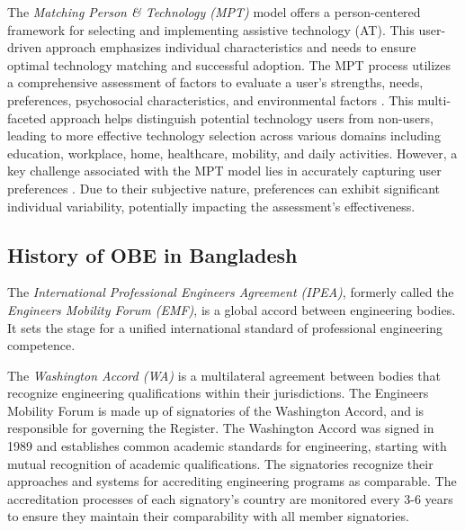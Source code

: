 \documentclass[journal,onecolumn]{IEEEtran}
\begin{document}
\vspace{12pt}


The \textit{Matching Person \& Technology (MPT)} model offers a person-centered framework for selecting and implementing assistive technology (AT). This user-driven approach emphasizes individual characteristics and needs to ensure optimal technology matching and successful adoption. The MPT process utilizes a comprehensive assessment of factors to evaluate a user's strengths, needs, preferences, psychosocial characteristics, and environmental factors \cite{scherer_matching_2017}. This multi-faceted approach helps distinguish potential technology users from non-users, leading to more effective technology selection across various domains including education, workplace, home, healthcare, mobility, and daily activities. However, a key challenge associated with the MPT model lies in accurately capturing user preferences \cite{scherer_matching_2002}. Due to their subjective nature, preferences can exhibit significant individual variability, potentially impacting the assessment's effectiveness.

\subsection{\textbf{History of OBE in Bangladesh}}
The \textit{International Professional Engineers Agreement (IPEA)}, formerly called the \textit{Engineers Mobility Forum (EMF)}, is a global accord between engineering bodies. It sets the stage for a unified international standard of professional engineering competence.

The \textit{Washington Accord (WA)} is a multilateral agreement between bodies that recognize engineering qualifications within their jurisdictions. The Engineers Mobility Forum is made up of signatories of the Washington Accord, and is responsible for governing the Register. The Washington Accord was signed in 1989 and establishes common academic standards for engineering, starting with mutual recognition of academic qualifications. The signatories recognize their approaches and systems for accrediting engineering programs as comparable. The accreditation processes of each signatory's country are monitored every 3-6 years to ensure they maintain their comparability with all member signatories. 
\vspace{12pt}
\end{document}

